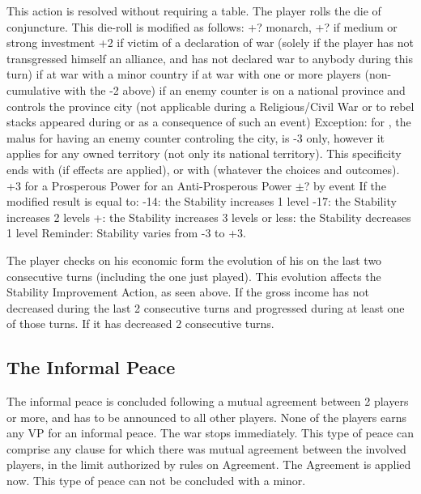 \aparag[Procedure]
This action is resolved without requiring a table.  The player rolls the die
of conjuncture. This die-roll is modified as follows:
\bparag +? \ADM monarch,
\bparag +? if medium or strong investment
\bparag +2 if victim of a declaration of war (solely if the player has not
transgressed himself an alliance, and has not declared war to anybody during
this turn)
 if at war with a minor country
 if at war with one or more players (non-cumulative with the -2
above)
 if an enemy \ARMY counter is on a national province and controls
the province city (not applicable during a Religious/Civil War or to rebel
stacks appeared during or as a consequence of such an event)
 Exception: for \SPA, the malus for having an enemy \ARMY counter
controling the city, is -3 only, however it applies for any owned territory
(not only its national territory).  This specificity ends
with  (if effects are applied), or with
 (whatever the choices and outcomes).
\bparag +3 for a Prosperous Power
 for an Anti-Prosperous Power
\bparag $\pm$? by event
\aparag[Result]
If the modified result is equal to:
-14: the Stability increases 1 level
-17: the Stability increases 2 levels
+: the Stability increases 3 levels
 or less: the Stability decreases 1 level
\bparag Reminder: Stability varies from -3 to +3.

\aparag[Prosperity]\label{chPeace:Prosperity}
The player checks on his economic form the evolution of his  on the last two consecutive turns (including the one just
played). This evolution affects the Stability Improvement Action, as seen
above.
If the gross income has not decreased during the last 2 consecutive turns and
progressed during at least one of those turns.
If it has decreased 2 consecutive turns.



\subsection{The Informal Peace}

\aparag The informal peace is concluded following a mutual agreement between 2
players or more, and has to be announced to all other players.
\aparag[Consequences]
None of the players earns any VP for an informal peace. The war stops
immediately.
\bparag This type of peace can comprise any clause for which there was mutual
agreement between the involved players, in the limit authorized by rules on
Agreement. The Agreement is applied now.
\bparag This type of peace can not be concluded with a minor.



